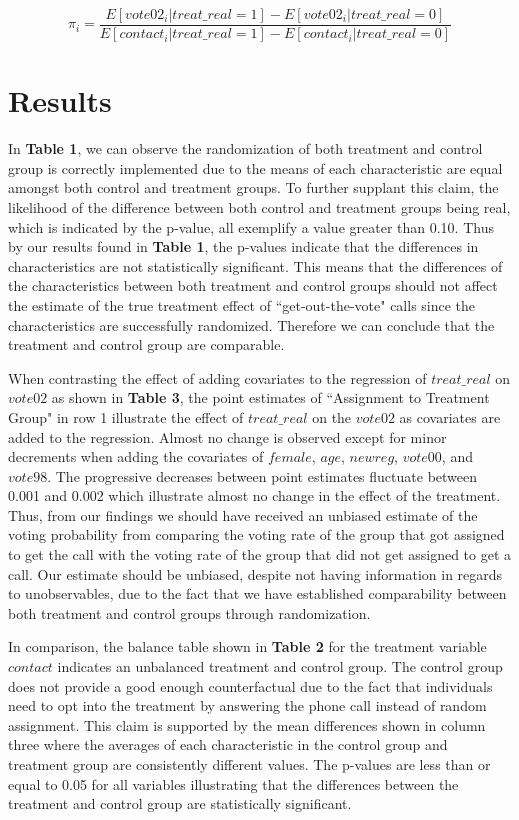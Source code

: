 \documentclass[12pt]{article}
\begin{document}
$$\pi_i = \frac{E[vote02_i|treat\_real=1]- E[vote02_i|treat\_real=0]}{E[contact_i|treat\_real=1]- E[contact_i|treat\_real=0]}$$

\section{Results}
In \textbf{Table 1}, we can observe the randomization of both treatment and control group is correctly implemented due to the means of each characteristic are equal amongst both control and treatment groups. To further supplant this claim, the likelihood of the difference between both control and treatment groups being real, which is indicated by the p-value, all exemplify a value greater than 0.10. Thus by our results found in \textbf{Table 1}, the p-values indicate that the differences in characteristics are not statistically significant. This means that the differences of the characteristics between both treatment and control groups should not affect the estimate of the true treatment effect of ``get-out-the-vote" calls since the characteristics are successfully randomized. Therefore we can conclude that the treatment and control group are comparable.

\indent When contrasting the effect of adding covariates to the regression of $treat\_real$ on $vote02$ as shown in \textbf{Table 3}, the point estimates of ``Assignment to Treatment Group" in row 1 illustrate the effect of $treat\_real$ on the $vote02$ as covariates are added to the regression. Almost no change is observed except for minor decrements when adding the covariates of $female$, $age$, $newreg$, $vote00$, and $vote98$. The progressive decreases between point estimates fluctuate between 0.001 and 0.002 which illustrate almost no change in the effect of the treatment. Thus, from our findings we should have received an unbiased estimate of the voting probability from comparing the voting rate of the group that got assigned to get the call with the voting rate of the group that did not get assigned to get a call. Our estimate should be unbiased, despite not having information in regards to unobservables, due to the fact that we have established comparability between both treatment and control groups through randomization.

\indent In comparison, the balance table shown in \textbf{Table 2} for the treatment variable $contact$ indicates an unbalanced treatment and control group. The control group does not provide a good enough counterfactual due to the fact that individuals need to opt into the treatment by answering the phone call instead of random assignment. This claim is supported by the mean differences shown in column three where the averages of each characteristic in the control group and treatment group are consistently different values. The p-values are less than or equal to 0.05 for all variables illustrating that the differences between the treatment and control group are statistically significant. 
\end{document}
